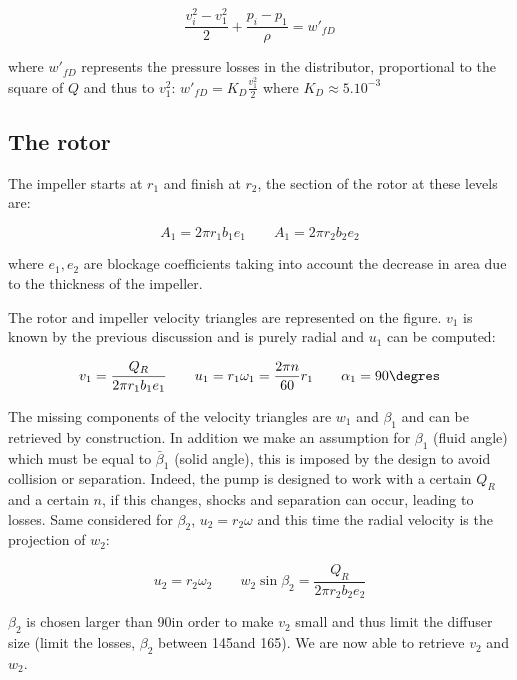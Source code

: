 \begin{equation}
\frac{v_i^2-v_1^2}{2} + \frac{p_i-p_1}{\rho} = w'_{fD}
\end{equation}

where $w'_{fD}$ represents the pressure losses in the distributor, proportional to the square of $Q$ and thus to $v_1^2$: $w'_{fD}= K_D \frac{v^2_1}{2}$ where $K_D \approx 5.10^{-3}$

\subsection{The rotor}
The impeller starts at $r_1$ and finish at $r_2$, the section of the rotor at these levels are: 

\begin{equation}
A_1 = 2\pi r_1b_1 e_1 \qquad A_1 = 2\pi r_2b_2 e_2
\end{equation}

where $e_1,e_2$ are blockage coefficients taking into account the decrease in area due to the thickness of the impeller. 

The rotor and impeller velocity triangles are represented on the figure. $v_1$ is known by the previous discussion and is purely radial and $u_1$ can be computed: 

\begin{equation}
v_1 = \frac{Q_R}{2\pi r_1 b_1 e_1} \qquad u_1 =r_1\omega _1 = \frac{2\pi n}{60} r_1 \qquad \alpha _1 = 90\degres
\end{equation}

The missing components of the velocity triangles are $w_1$ and $\beta _1$ and can be retrieved by construction. In addition we make an assumption for $\beta _1$ (fluid angle) which must be equal to $\bar{\beta} _1$ (solid angle), this is imposed by the design to avoid collision or separation. Indeed, the pump is designed to work with a certain $Q_R$ and a certain $n$, if this changes, shocks and separation can occur, leading to losses. Same considered for $\beta _2$, $u_2 = r_2 \omega$ and this time the radial velocity is the projection of $w_2$: 

\begin{equation}
u_2 = r_2 \omega _2 \qquad w_2 \sin \beta _2 = \frac{Q_R}{2\pi r_2 b_2 e_2}
\label{2.9}
\end{equation}

$\beta _2$ is chosen larger than 90\degres in order to make $v_2$ small and thus limit the diffuser size (limit the losses, $\beta _2$ between 145\degres and 165\degres). We are now able to retrieve $v_2$ and $w_2$. 


